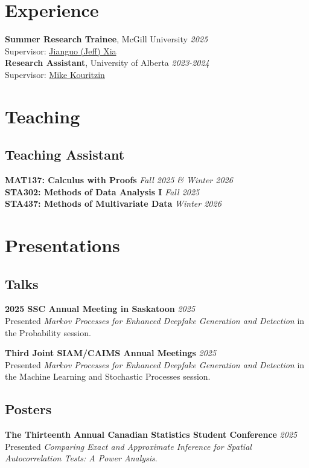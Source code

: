 \documentclass[11pt]{article}
\theoremstyle{definition}
\newcommand{\1}{\mathds 1}
\begin{document}
\section*{Experience}
\textbf{Summer Research Trainee}, McGill University \hfill \textit{2025}\\
\indent\hspace{0.2cm} Supervisor: \href{https://www.xialab.ca/}{Jianguo (Jeff) Xia}\\
\textbf{Research Assistant}, University of Alberta \hfill \textit{2023-2024}\\
\indent\hspace{0.2cm} Supervisor: \href{https://www.math.ualberta.ca/~mkouritz/Kouritzin_M.html}{Mike Kouritzin}

\section*{Teaching}
\subsection*{Teaching Assistant}
\textbf{MAT137: Calculus with Proofs} \hfill \textit{Fall 2025 \& Winter 2026}\\
\textbf{STA302: Methods of Data Analysis I} \hfill \textit{Fall 2025}\\
\textbf{STA437: Methods of Multivariate Data} \hfill \textit{Winter 2026}   

\section*{Presentations}
\subsection*{Talks}
\textbf{2025 SSC Annual Meeting in Saskatoon} \hfill \textit{2025}\\
Presented \textit{Markov Processes for Enhanced Deepfake Generation and Detection} in the Probability session. 

\textbf{Third Joint SIAM/CAIMS Annual Meetings} \hfill \textit{2025}\\
Presented \textit{Markov Processes for Enhanced Deepfake Generation and Detection} in the Machine Learning and Stochastic Processes session.

\subsection*{Posters}
\textbf{The Thirteenth Annual Canadian Statistics Student Conference} \hfill \textit{2025}\\
Presented \textit{Comparing Exact and Approximate Inference for Spatial Autocorrelation Tests: A Power Analysis}.
\end{document}
